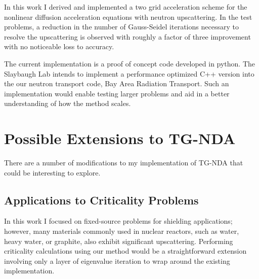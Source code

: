 
In this work I derived and implemented a two grid acceleration scheme for the nonlinear diffusion acceleration equations with neutron upscattering. In the test problems, a reduction in the number of Gauss-Seidel iterations necessary to resolve the upscattering is observed with roughly a factor of three improvement with no noticeable loss to accuracy. 

The current implementation is a proof of concept code developed in python. The Slaybaugh Lab intends to implement a performance optimized C++ version into the our neutron transport code, Bay Area Radiation Transport. Such an implementation would enable testing larger problems and aid in a better understanding of how the method scales.

\section{Possible Extensions to TG-NDA}
There are a number of modifications to my implementation of TG-NDA that could be interesting to explore. 


\subsection{Applications to Criticality Problems}
In this work I focused on fixed-source problems for shielding applications; however,
 many materials commonly used in nuclear reactors, such as water, heavy water, or graphite, also exhibit significant upscattering. Performing criticality calculations using our method would be a straightforward extension involving only a layer of eigenvalue iteration to wrap around the existing implementation. 


